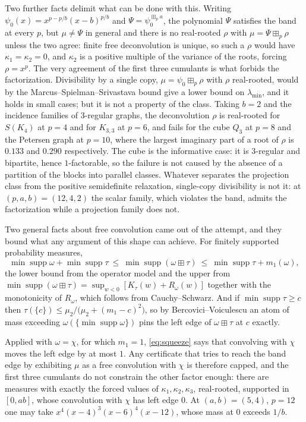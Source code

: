 \documentclass[11pt]{article}
\theoremstyle{remark}
\begin{document}
Two further facts delimit what can be done with this. Writing
$\psi_0(x)=x^{p-p/b}(x-b)^{p/b}$ and $\Psi=\psi_0^{\boxplus_pa}$, the polynomial
$\Psi$ satisfies the band at every $p$, but $\mu\ne\Psi$ in general and there is no
real-rooted $\rho$ with $\mu=\Psi\boxplus_p\rho$ unless the two agree: finite free
deconvolution is unique, so such a $\rho$ would have $\kappa_1=\kappa_2=0$, and
$\kappa_2$ is a positive multiple of the variance of the roots, forcing
$\rho=x^p$. The very agreement of the first three cumulants is what forbids the
factorization. Divisibility by a single copy, $\mu=\psi_0\boxplus_p\rho$ with $\rho$ real-rooted,
would by the Marcus--Spielman--Srivastava bound give a lower bound on
$\lambda_{\min}$, and it holds in small cases; but it is not a property of the
class. Taking $b=2$ and the incidence families of $3$-regular graphs, the
deconvolution $\rho$ is real-rooted for $S(K_4)$ at $p=4$ and for $K_{3,3}$ at
$p=6$, and fails for the cube $Q_3$ at $p=8$ and the Petersen graph at $p=10$,
where the largest imaginary part of a root of $\rho$ is $0.133$ and $0.290$
respectively. The cube is the informative case: it is $3$-regular and bipartite,
hence $1$-factorable, so the failure is not caused by the absence of a partition of
the blocks into parallel classes. Whatever separates the projection class from the
positive semidefinite relaxation, single-copy divisibility is not it: at
$(p,a,b)=(12,4,2)$ the scalar family, which violates the band, admits the
factorization while a projection family does not.

Two general facts about free convolution came out of the attempt, and they bound
what any argument of this shape can achieve. For finitely supported probability
measures,
\begin{equation}\label{eq:squeeze}
\min\operatorname{supp}\omega+\min\operatorname{supp}\tau
\ \le\ \min\operatorname{supp}(\omega\boxplus\tau)
\ \le\ \min\operatorname{supp}\tau+m_1(\omega),
\end{equation}
the lower bound from the operator model and the upper from
$\min\operatorname{supp}(\omega\boxplus\tau)=\sup_{w<0}[K_\tau(w)+R_\omega(w)]$
together with the monotonicity of $R_\omega$, which follows from Cauchy--Schwarz.
And if $\min\operatorname{supp}\tau\ge c$ then
$\tau(\{c\})\le\mu_2/\bigl(\mu_2+(m_1-c)^2\bigr)$, so by Bercovici--Voiculescu an
atom of mass exceeding $\omega(\{\min\operatorname{supp}\omega\})$ pins the left
edge of $\omega\boxplus\tau$ at $c$ exactly.

Applied with $\omega=\chi$, for which $m_1=1$, \eqref{eq:squeeze} says that
convolving with $\chi$ moves the left edge by at most $1$. Any certificate that
tries to reach the band edge by exhibiting $\mu$ as a free convolution with $\chi$
is therefore capped, and the first three cumulants do not constrain the other
factor enough: there are measures with exactly the forced values of
$\kappa_1,\kappa_2,\kappa_3$, real-rooted, supported in $[0,ab]$, whose convolution
with $\chi$ has left edge $0$. At $(a,b)=(5,4)$, $p=12$ one may take
$x^4(x-4)^3(x-6)^4(x-12)$, whose mass at $0$ exceeds $1/b$.
\end{document}
